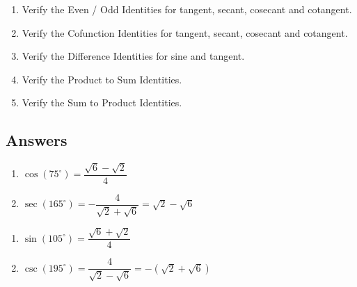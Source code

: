 \begin{enumerate}

\setcounter{enumi}{\value{HW}}

\item Verify the Even / Odd Identities for tangent, secant, cosecant and cotangent.

\item Verify the Cofunction Identities for tangent, secant, cosecant and cotangent.

\item Verify the Difference Identities for sine and tangent.

\item Verify the Product to Sum Identities.

\item Verify the Sum to Product Identities.

\end{enumerate}

\newpage

\subsection{Answers}

\begin{multicols}{2}

\begin{enumerate}

\addtocounter{enumi}{6}

\item  $\cos(75^{\circ}) = \dfrac{\sqrt{6} - \sqrt{2}}{4} $
\item  $\sec(165^{\circ}) = -\dfrac{4}{\sqrt{2}+\sqrt{6}} = \sqrt{2} - \sqrt{6}$

\setcounter{HW}{\value{enumi}}

\end{enumerate}

\end{multicols}

\begin{multicols}{2}

\begin{enumerate}

\setcounter{enumi}{\value{HW}}

\item  $\sin(105^{\circ}) = \dfrac{\sqrt{6}+\sqrt{2}}{4}$
\item  $\csc(195^{\circ}) = \dfrac{4}{\sqrt{2}-\sqrt{6}} = -(\sqrt{2}+\sqrt{6})$

\setcounter{HW}{\value{enumi}}

\end{enumerate}

\end{multicols}

